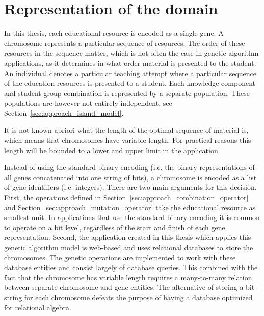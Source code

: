 \section{Representation of the domain}
\label{sec:approach_representation}
In this thesis, each educational resource is encoded as a single gene. A
chromosome represents a particular sequence of resources. The order of these
resources in the sequence matter, which is not often the case in genetic
algorithm applications, as it determines in what order material is presented to
the student. An individual denotes a particular teaching attempt where a particular
sequence of the education resources is presented to a student. Each knowledge
component and student group combination is represented by a separate
population. These populations are however not entirely independent, see
Section~\ref{sec:approach_island_model}.

It is not known apriori what the length of the optimal sequence of material is,
which means that chromosomes have variable length. For practical reasons this
length will be bounded to a lower and upper limit in the application. 

Instead of using the standard binary encoding (i.e. the binary representations
of all genes concatenated into one string of bits), a chromosome is encoded as a list
of gene identifiers (i.e. integers). There are two main arguments for this decision.
First, the operations defined in Section~\ref{sec:approach_combination_operator}
and Section~\ref{sec:approach_mutation_operator}
take the educational resource as smallest unit. In applications that use the
standard binary encoding it is common to operate on a bit level, regardless of
the start and finish of each gene representation. Second, the application
created in this thesis which applies this genetic algorithm model is web-based
and uses relational databases to store the chromosomes. The genetic operations
are implemented to work with these database entities and consist largely of
database queries. This combined with the fact that the chromosome has variable
length requires a many-to-many relation between separate chromosome and gene
entities. The alternative of storing a bit string for each chromosome defeats
the purpose of having a database optimized for relational algebra.

